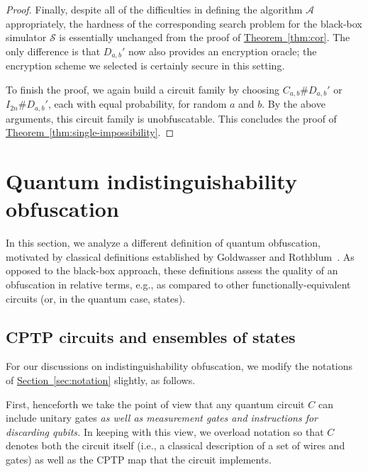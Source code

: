 \documentclass[envcountsame]{llncs}
\numberwithin{equation}{section}
\newcommand{\expref}[2]{\texorpdfstring{\hyperref[#2]{#1~\ref{#2}}}{#1~\ref{#2}}}
\newcommand{\algo}{\mathcal}
\begin{document}
\begin{proof}
Finally, despite all of the difficulties in defining the algorithm $\algo A$ appropriately, the hardness of the corresponding search problem for the black-box simulator $\algo S$ is essentially unchanged from the proof of \expref{Theorem}{thm:cor}. The only difference is that $D_{a, b}'$ now also provides an encryption oracle; the encryption scheme we selected is certainly secure in this setting. 

To finish the proof, we again build a circuit family by choosing $C_{a, b} \# D_{a, b}'$ or $I_{2n} \# D_{a, b}'$, each with equal probability, for random $a$ and $b$. By the above arguments, this circuit family is unobfuscatable. This concludes the proof of \expref{Theorem}{thm:single-impossibility}.
\end{proof}


\section{Quantum indistinguishability obfuscation}\label{sec:indistinguishability}

In this section, we analyze a different definition of quantum obfuscation, motivated by classical definitions established by Goldwasser and Rothblum~\cite{GR07}. As opposed to the black-box approach, these definitions assess the quality of an obfuscation in relative terms, e.g., as compared to other functionally-equivalent circuits (or, in the quantum case, states).  

\subsection{CPTP circuits and ensembles of states}

For our discussions on indistinguishability obfuscation, we modify the notations of \expref{Section}{sec:notation} slightly, as follows. 

First, henceforth we take the point of view that any quantum circuit $C$ can include unitary gates \emph{as well as measurement gates and instructions for discarding qubits.} In keeping with this view, we overload notation so that $C$ denotes both the circuit itself (i.e., a classical description of a set of wires and gates) as well as the CPTP map that the circuit implements. 
\end{document}
